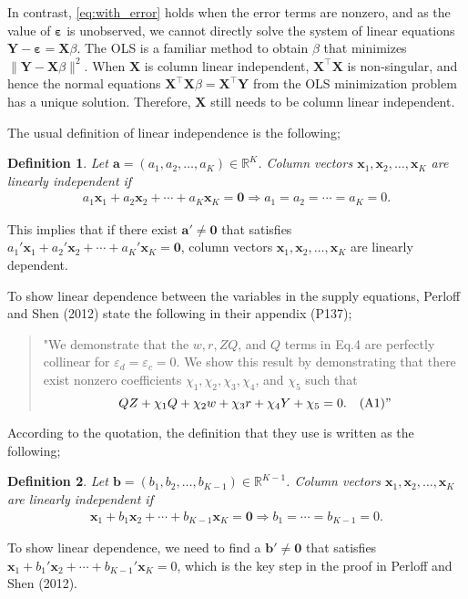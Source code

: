 \documentclass[11pt, a4paper]{article}
\newtheorem{definition}{Definition}
\begin{document}
In contrast, \eqref{eq:with_error} holds when the error terms are nonzero, and as the value of $\bm{\varepsilon}$ is unobserved, we cannot directly solve the system of linear equations $\bm{Y}- \bm{\varepsilon} = \bm{X}\beta$.
The OLS is a familiar method to obtain $\beta$ that minimizes $\| \bm{Y}- \bm{X}\beta\|^2$.
When $\bm{X}$ is column linear independent, $\bm{X}^\top \bm{X}$ is non-singular, and hence the normal equations 
$\bm{X}^\top \bm{X} \beta = \bm{X}^\top \bm{Y}$ from the OLS minimization problem has a unique solution.
Therefore, $\bm{X}$ still needs to be column linear independent.


\newpage

The usual definition of linear independence is the following;
\begin{definition}\label{def: original}
    Let $\bm{a} = (a_1, a_2, \ldots, a_K) \in \mathbb{R}^K$. Column vectors $\bm{x}_1, \bm{x}_2, \ldots, \bm{x}_K$ are linearly independent if
    \begin{align*}
        a_1 \bm{x}_1 + a_2 \bm{x}_2 + \cdots + a_K \bm{x}_K = \bm{0} \Longrightarrow a_1 = a_2 = \cdots = a_K = 0. 
    \end{align*}
\end{definition}
This implies that if there exist $\bm{a}' \ne \bm{0}$ that satisfies $a_1' \bm{x}_1 + a_2' \bm{x}_2 + \cdots + a_K' \bm{x}_K = \bm{0}$, column vectors $\bm{x}_1, \bm{x}_2, \ldots, \bm{x}_K$ are linearly dependent.


To show linear dependence between  the variables in the supply equations, Perloff and Shen (2012) state the following in their appendix (P137);
\begin{quote}
    "We demonstrate that the $w, r, ZQ$, and $Q$ terms in Eq.4 are perfectly collinear for $\varepsilon_d = \varepsilon_c = 0$. We show this result by demonstrating that there exist nonzero coefficients $\chi_1,\chi_2,\chi_3,\chi_4$, and $\chi_5$ such that 
    \[QZ + \chi_1 Q + \chi_2 w + \chi_3 r + \chi_4 Y + \chi_5 = 0.\quad \text{(A1)}"\]
\end{quote}
According to the quotation, the definition that they use is written as the following;
\begin{definition}\label{def: ps_original}
    Let $\bm{b} = (b_1, b_2, \ldots, b_{K-1}) \in \mathbb{R}^{K-1}$. Column vectors $\bm{x}_1, \bm{x}_2, \ldots, \bm{x}_K$ are linearly independent if
    \begin{align*}
        \bm{x}_1 + b_1 \bm{x}_2 + \cdots + b_{K-1} \bm{x}_K = \bm{0} \Longrightarrow b_1 = \cdots = b_{K-1}= 0. 
    \end{align*}
\end{definition}
To show linear dependence, we need to find a $\bm{b}' \ne \bm{0}$ that satisfies $\bm{x}_1 + b_1' \bm{x}_2 + \cdots + b_{K-1}' \bm{x}_K = 0$, which is the key step in the proof in Perloff and Shen (2012).
\end{document}
